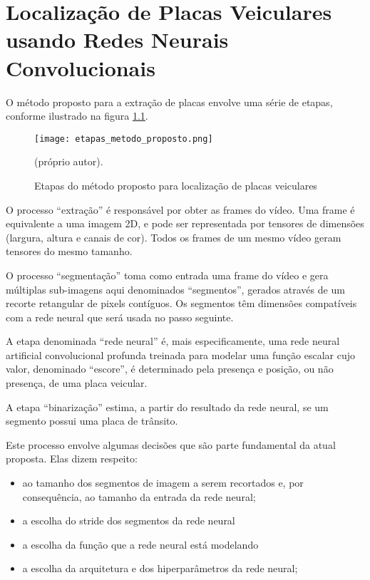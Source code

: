 
\chapter{Localização de Placas Veiculares usando Redes Neurais Convolucionais}

O método proposto para a extração de placas envolve uma série de etapas,
conforme ilustrado na figura \ref{fig:etapas_metodo_proposto}.

\begin{figure}[!htb]
	\centering
	\texttt{[image: etapas\_metodo\_proposto.png]}
	\caption{Etapas do método proposto para localização de placas veiculares}
	\label{fig:etapas_metodo_proposto}
	(próprio autor).
\end{figure}

O processo “extração” é responsável por obter as frames do vídeo. Uma frame é
equivalente a uma imagem 2D, e pode ser representada por tensores de dimensões
 (largura, altura e canais de cor). Todos os frames de um mesmo vídeo geram
tensores do mesmo tamanho.

O processo “segmentação” toma como entrada uma frame do vídeo e gera múltiplas
sub-imagens aqui denominados “segmentos”, gerados através de um recorte
retangular de pixels contíguos. Os segmentos têm dimensões compatíveis com a
rede neural que será usada no passo seguinte.

A etapa denominada “rede neural” é, mais especificamente, uma rede neural
artificial convolucional profunda treinada para modelar uma função escalar cujo
valor, denominado “escore”, é determinado pela presença e posição, ou não
presença, de uma placa veicular.

A etapa “binarização” estima, a partir do resultado da rede neural, se um
segmento possui uma placa de trânsito.

Este processo envolve algumas decisões que são parte fundamental da atual
proposta. Elas dizem respeito:

\begin{itemize}
\item ao tamanho dos segmentos de imagem a serem recortados e, por
	consequência, ao tamanho da entrada da rede neural;
\item a escolha do stride dos segmentos da rede neural
\item a escolha da função que a rede neural está modelando
\item a escolha da arquitetura e dos hiperparâmetros da rede neural;
\end{itemize}


